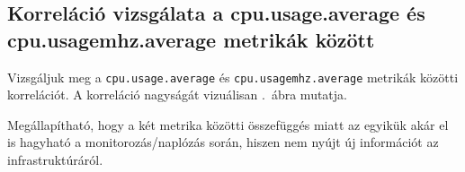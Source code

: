 \documentclass[a4paper,10pt,titlepage]{article}
\newcommand{\todo}[1]{
    \vfill
    \begingroup
        \setlength{\parindent}{0cm}
        \fcolorbox{todofrszin}{todobgszin}{
            \parbox{\textwidth}{
                \vskip10pt
                \leftskip10pt
                \rightskip10pt
            
                \emph{TODO: #1}
  
                \vskip10pt
            }
        }
    \endgroup
    \vfill
}
\begin{document}
%
%


\subsection{Korreláció vizsgálata a cpu.usage.average és cpu.usagemhz.average metrikák között}



Vizsgáljuk meg a \texttt{cpu.usage.average} és \texttt{cpu.usagemhz.average} metrikák közötti korrelációt. A korreláció nagyságát vizuálisan .~ábra mutatja.

Megállapítható, hogy a két metrika közötti összefüggés miatt az egyikük akár el is hagyható a monitorozás/naplózás során, hiszen nem nyújt új információt az infrastruktúráról. 
\end{document}
